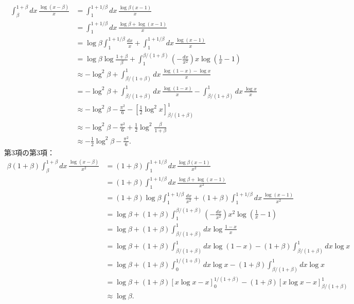 \begin{align*}
  \int_\beta^{1+\beta} dx \, \frac{\log (x-\beta)}{x}
  &= \int_1^{1+1/\beta} dx \, \frac{\log \beta(x-1)}{x} \\
  &= \int_1^{1+1/\beta} dx \, \frac{\log \beta + \log (x-1)}{x} \\
  &= \log \beta \int_1^{1+1/\beta} \frac{dx}{x} + \int_1^{1+1/\beta} dx \, \frac{\log (x-1)}{x} \\
  &= \log \beta \log \frac{1+\beta}{\beta} + \int_1^{\beta/(1+\beta)} \left( - \frac{dx}{x^2} \right) x \log\left( \frac{1}{x} - 1 \right)  \\
  &\approx - \log^2 \beta + \int_{\beta/(1+\beta)}^1 dx \, \frac{\log(1-x) - \log x}{x} \\
  &= - \log^2 \beta + \int_{\beta/(1+\beta)}^1 dx \, \frac{\log(1-x)}{x}
  - \int_{\beta/(1+\beta)}^1 dx \, \frac{\log x}{x} \\
  &\approx - \log^2 \beta - \frac{\pi^2}{6} - \left[ \frac{1}{2} \log^2 x \right]_{\beta/(1+\beta)}^1 \\
  &\approx - \log^2 \beta - \frac{\pi^2}{6} + \frac{1}{2} \log^2 \frac{\beta}{1+\beta} \\
  &\approx - \frac{1}{2} \log^2 \beta - \frac{\pi^2}{6} .
\end{align*}
第3項の第3項：
\begin{align*}
  \beta(1+\beta) \int_\beta^{1+\beta} dx \, \frac{\log (x-\beta)}{x^2}
  &= (1+\beta) \int_1^{1+1/\beta} dx \, \frac{\log\beta(x-1)}{x^2} \\
  &= (1+\beta) \int_1^{1+1/\beta} dx \, \frac{\log\beta + \log(x-1)}{x^2} \\
  &= (1+\beta) \log\beta \int_1^{1+1/\beta} \frac{dx}{x^2}
  + (1+\beta) \int_1^{1+1/\beta} dx \, \frac{\log(x-1)}{x^2} \\
  &= \log\beta + (1+\beta) \int_1^{\beta/(1+\beta)} \left( - \frac{dx}{x^2} \right) x^2 \log \left( \frac{1}{x} - 1 \right) \\
  &= \log\beta + (1+\beta) \int_{\beta/(1+\beta)}^1 dx \log \frac{1-x}{x} \\
  &= \log\beta + (1+\beta) \int_{\beta/(1+\beta)}^1 dx \log (1-x) - (1+\beta) \int_{\beta/(1+\beta)}^1 dx \log x \\
  &= \log\beta + (1+\beta) \int_0^{1/(1+\beta)} dx \log x - (1+\beta) \int_{\beta/(1+\beta)}^1 dx \log x \\
  &= \log\beta + (1+\beta) [x\log x - x]_0^{1/(1+\beta)} - (1+\beta) [x\log x - x]_{\beta/(1+\beta)}^1 \\
  &\approx \log \beta .
\end{align*}
